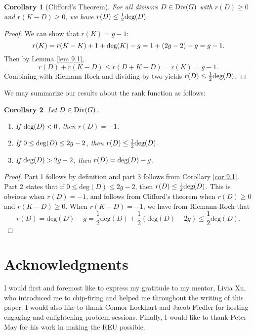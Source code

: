\documentclass[openany, amssymb, psamsfonts]{amsart}
\newtheorem{cor}{Corollary}[section]
\theoremstyle{definition}
\numberwithin{equation}{section}
\begin{document}
\begin{cor}[Clifford's Theorem]
\label{cor 9.2}
For all divisors $D\in \textup{Div}(G)$ with $r(D)\geq 0$ and $r(K-D)\geq 0$, we have $r(D)\leq \frac{1}{2}\textup{deg}(D)$.
\end{cor}
\begin{proof}
We can show that $r(K)=g-1$:
\[r(K)=r(K-K)+1+\textup{deg}(K)-g=1+(2g-2)-g=g-1.\]
Then by Lemma \ref{lem 9.1},
\[r(D)+r(K-D)\leq r(D+K-D)=r(K)=g-1.\] 
Combining with Riemann-Roch and dividing by two yields $r(D)\leq \frac{1}{2}\textup{deg}(D)$.
\end{proof}

We may summarize our results about the rank function as follows:
\begin{cor}
\label{cor 9.3}
Let $D\in \textup{Div}(G)$.
\begin{enumerate}
    \item If $\textup{deg}(D)<0$, then $r(D)=-1$.
    \item If $0\leq \textup{deg}(D)\leq 2g-2$, then $r(D)\leq \frac{1}{2}\textup{deg}(D)$.
    \item If $\textup{deg}(D)>2g-2$, then $r(D)=\textup{deg}(D)-g$.
\end{enumerate}
\end{cor}
\begin{proof}
Part 1 follows by definition and part 3 follows from Corollary \ref{cor 9.1}. Part 2 states that if $0\leq \text{deg}(D)\leq 2g-2$, then $r(D)\leq \frac{1}{2}\textup{deg}(D)$. This is obvious when $r(D)=-1$, and follows from Clifford's theorem when $r(D)\geq 0$ and $r(K-D)\geq 0$. When $r(K-D)=-1$, we have from Riemann-Roch that 
\[r(D)=\text{deg}(D)-g=\frac{1}{2}\text{deg}(D)+\frac{1}{2}(\text{deg}(D)-2g)\leq \frac{1}{2}\text{deg}(D).\]
\end{proof}





\section*{Acknowledgments}

I would first and foremost like to express my gratitude to my mentor, Livia Xu, who introduced me to chip-firing and helped me throughout the writing of this paper. I would also like to thank Connor Lockhart and Jacob Fiedler for hosting engaging and enlightening problem sessions. Finally, I would like to thank Peter May for his work in making the REU possible.
\end{document}
